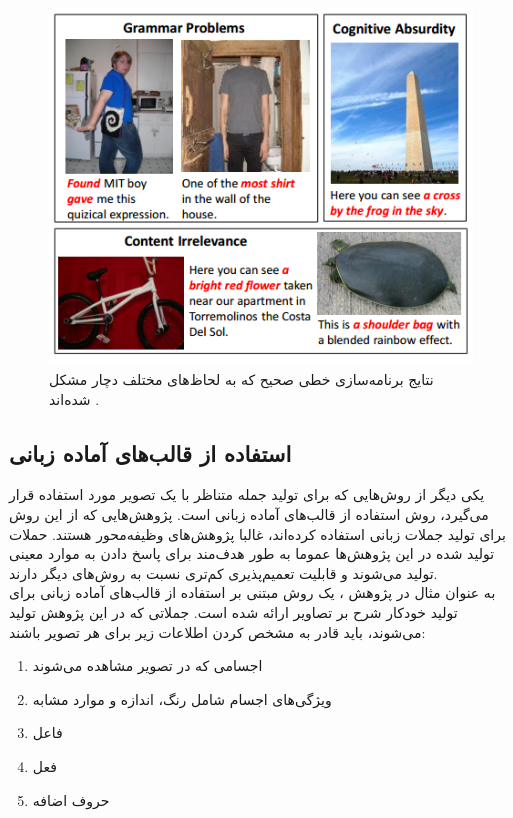 \begin{figure}[H]
\center
\includegraphics[scale=0.6]{Imgs/sentence_knn4.png}
\caption{نتایج برنامه‌سازی خطی صحیح که به لحاظ‌های مختلف دچار مشکل شده‌اند \cite{kuznetsova2012collective}.}
\label{fig:knn4}
\end{figure}

\subsection{استفاده از قالب‌های آماده زبانی}

یکی دیگر از روش‌هایی که برای تولید جمله متناظر با یک تصویر مورد استفاده قرار می‌گیرد، روش استفاده از قالب‌های آماده زبانی است. پژوهش‌هایی که از این روش برای تولید جملات زبانی استفاده کرده‌اند، غالبا پژوهش‌های وظیفه‌‌محور هستند. حملات تولید شده در این پژوهش‌ها عموما به طور هدف‌مند برای پاسخ دادن به موارد معینی تولید می‌شوند و قابلیت تعمیم‌پذیری کم‌تری نسبت به روش‌های دیگر دارند.
\\
به عنوان مثال در پژوهش \cite{gupta2012image}، یک روش مبتنی بر استفاده از قالب‌های آماده زبانی برای تولید خودکار شرح بر تصاویر ارائه شده است. جملاتی که در این پژوهش تولید می‌شوند، باید قادر به مشخص کردن اطلاعات زیر برای هر تصویر باشند:
\begin{enumerate}
\item اجسامی که در تصویر مشاهده می‌شوند
\item ويژگی‌های اجسام شامل رنگ، اندازه و موارد مشابه
\item فاعل
\item فعل
\item حروف اضافه
\end{enumerate}

